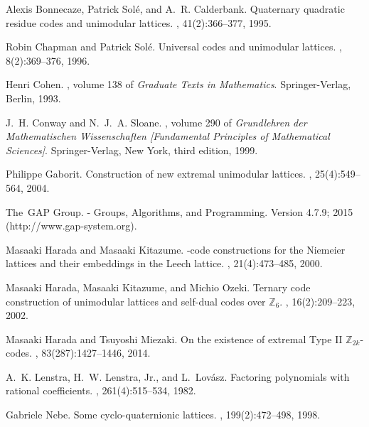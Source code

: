 \documentclass{amsart}
\begin{document}
\begin{thebibliography}{10}

Alexis Bonnecaze, Patrick Sol\'e, and A.~R. Calderbank.
\newblock Quaternary quadratic residue codes and unimodular lattices.
, 41(2):366--377, 1995.

Robin Chapman and Patrick Sol\'e.
\newblock Universal codes and unimodular lattices.
, 8(2):369--376, 1996.

Henri Cohen.
, volume 138
  of {\em Graduate Texts in Mathematics}.
\newblock Springer-Verlag, Berlin, 1993.

J.~H. Conway and N.~J.~A. Sloane.
, volume 290 of {\em
  Grundlehren der Mathematischen Wissenschaften [Fundamental Principles of
  Mathematical Sciences]}.
\newblock Springer-Verlag, New York, third edition, 1999.

Philippe Gaborit.
\newblock Construction of new extremal unimodular lattices.
, 25(4):549--564, 2004.

The~GAP Group.
 - {G}roups, {A}lgorithms, and {P}rogramming.
\newblock Version 4.7.9; 2015 (http://www.gap-system.org).

Masaaki Harada and Masaaki Kitazume.
-code constructions for the {N}iemeier lattices and their
  embeddings in the {L}eech lattice.
, 21(4):473--485, 2000.

Masaaki Harada, Masaaki Kitazume, and Michio Ozeki.
\newblock Ternary code construction of unimodular lattices and self-dual codes
  over {$\mathbb{Z}_6$}.
, 16(2):209--223, 2002.

Masaaki Harada and Tsuyoshi Miezaki.
\newblock On the existence of extremal {T}ype {II} {$\mathbb{Z}_{2k}$}-codes.
, 83(287):1427--1446, 2014.

A.~K. Lenstra, H.~W. Lenstra, Jr., and L.~Lov\'asz.
\newblock Factoring polynomials with rational coefficients.
, 261(4):515--534, 1982.

Gabriele Nebe.
\newblock Some cyclo-quaternionic lattices.
, 199(2):472--498, 1998.


\end{thebibliography}
\end{document}
